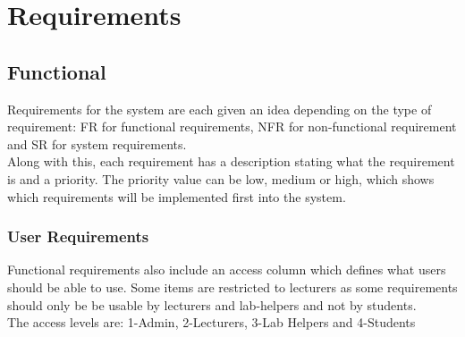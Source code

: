 \documentclass[12pt]{article}  %
\begin{document}

\newpage
\section{Requirements}
 


\subsection{Functional}
Requirements for the system are each given an idea depending on the type of requirement: FR for functional requirements, NFR for non-functional requirement and SR for system requirements.\\
Along with this, each requirement has a description stating what the requirement is and a priority. The priority value can be low, medium or high, which shows which requirements will be implemented first into the system.


\def\arraystretch{1.5}
\subsubsection{User Requirements}
Functional requirements also include an access column which defines what users should be able to use. Some items are restricted to lecturers as some requirements should only be be usable by lecturers and lab-helpers and not by students.\\
The access levels are: 1-Admin, 2-Lecturers, 3-Lab Helpers and 4-Students
\end{document}
